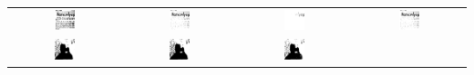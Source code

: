 \begin{table}
\begin{tabular}{c||c|c|c}
\includegraphics[width=0.2\textwidth]{img/res/e1a/alg1tipo1-09.jpg} &
\includegraphics[width=0.2\textwidth]{img/res/e1a/alg1tipo6-09.jpg} &
\includegraphics[width=0.2\textwidth]{img/res/e1a/alg1tipo6d0.75-09.jpg} &
\includegraphics[width=0.2\textwidth]{img/res/e1a/alg1tipo6d1.25-09.jpg} \\
\includegraphics[width=0.2\textwidth]{img/res/e1a/alg1tipo1-07.jpg} &
\includegraphics[width=0.2\textwidth]{img/res/e1a/alg1tipo6-07.jpg} &
\includegraphics[width=0.2\textwidth]{img/res/e1a/alg1tipo6d0.75-07.jpg} &

\end{tabular}
\end{table}

